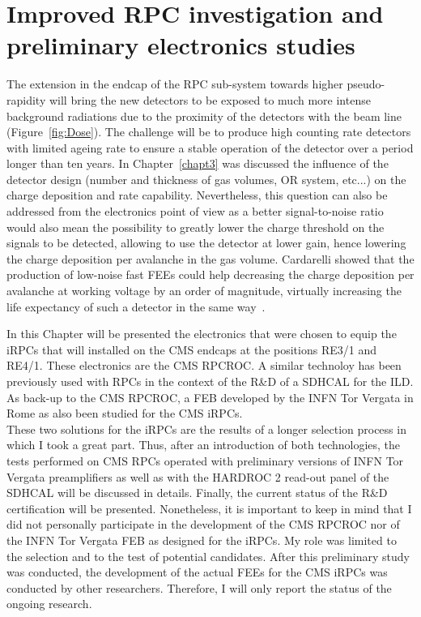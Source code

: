 \renewcommand\evenpagerightmark{{\scshape\small Chapter 6}}
\renewcommand\oddpageleftmark{{\scshape\small Improved RPC investigation and preliminary electronics studies}}

\renewcommand{\bibname}{References}

\hyphenation{}

\chapter[Improved RPC investigation and preliminary electronics studies]%
{Improved RPC investigation and preliminary electronics studies}
\label{chapt6}

	The extension in the endcap of the RPC sub-system towards higher pseudo-rapidity will bring the new detectors to be exposed to much more intense background radiations due to the proximity of the detectors with the beam line (Figure~\ref{fig:Dose}). The challenge will be to produce high counting rate detectors with limited ageing rate to ensure a stable operation of the detector over a period longer than ten years. In Chapter~\ref{chapt3} was discussed the influence of the detector design (number and thickness of gas volumes, OR system, etc...) on the charge deposition and rate capability. Nevertheless, this question can also be addressed from the electronics point of view as a better signal-to-noise ratio would also mean the possibility to greatly lower the charge threshold on the signals to be detected, allowing to use the detector at lower gain, hence lowering the charge deposition per avalanche in the gas volume. Cardarelli showed that the production of low-noise fast FEEs could help decreasing the charge deposition per avalanche at working voltage by an order of magnitude, virtually increasing the life expectancy of such a detector in the same way~\cite{CARDARELLI2012}.
	
	In this Chapter will be presented the electronics that were chosen to equip the iRPCs that will installed on the CMS endcaps at the positions RE3/1 and RE4/1. These electronics are the CMS RPCROC. A similar technoloy has been previously used with RPCs in the context of the R\&D of a \acf{SDHCAL} for the \acf{ILD}. As back-up to the CMS RPCROC, a FEB developed by the INFN Tor Vergata in Rome as also been studied for the CMS iRPCs.\\
	These two solutions for the iRPCs are the results of a longer selection process in which I took a great part. Thus, after an introduction of both technologies, the tests performed on CMS RPCs operated with preliminary versions of INFN Tor Vergata preamplifiers as well as with the HARDROC 2 read-out panel of the SDHCAL will be discussed in details. Finally, the current status of the R\&D certification will be presented. Nonetheless, it is important to keep in mind that I did not personally participate in the development of the CMS RPCROC nor of the INFN Tor Vergata FEB as designed for the iRPCs. My role was limited to the selection and to the test of potential candidates. After this preliminary study was conducted, the development of the actual FEEs for the CMS iRPCs was conducted by other researchers. Therefore, I will only report the status of the ongoing research.

